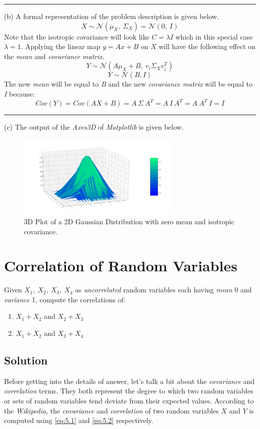 \documentclass[12pt]{article}
\numberwithin{equation}{section}
\numberwithin{table}{section}
\numberwithin{figure}{section}
\begin{document}
\noindent\rule{\textwidth}{.5pt}
(b) A formal representation of the problem description is given below.
$$
	X \sim \mathcal{N}(\mu_X, \ \Sigma_X) = \mathcal{N}(0, \ I)
$$
Note that the isotropic covariance will look like $C=\lambda I$ which in this special case $\lambda = 1$. Applying the linear map $y = Ax + B$ on $X$ will have the following effect on the \textit{mean} and \textit{covariance matrix}.
$$
	Y \sim \mathcal{N}(A\mu_X + B, \ v_i \Sigma_X v_i^T)
$$
$$
	Y \sim \mathcal{N}(B, I)
$$
The new \textit{mean} will be equal to \textit{B} and the new \textit{covariance matrix} will be equal to \textit{I} because:
$$
	Cov(Y) = Cov(AX + B) = A\ \Sigma \ A^T = A\ I\ A^T = A\ A^T\ I = I
$$
\noindent\rule{\textwidth}{.5pt}
(c) The output of the \textit{Axes3D} of \textit{Matplotlib} is given below.
\begin{figure}[!h]\centering
	\includegraphics[width=0.7\textwidth]{multivariate_normal.png}
	\caption{3D Plot of a 2D Gaussian Distribution with zero mean and isotropic covariance.}
	\label{figsolplot}
\end{figure}
\newpage

\section{Correlation of Random Variables}
Given $X_1,\ X_2,\ X_3,\ X_4$ as \textit{uncorrelated} random variables each having \textit{mean} 0 and \textit{variance} 1, compute the correlations of:\\
\begin{enumerate}[label=(\alph*)]
	\item $X_1 + X_2$ and $X_2 + X_3$
	
	\item $X_1 + X_2$ and $X_3 + X_4$
\end{enumerate}

\subsection*{Solution}
Before getting into the details of answer, let's talk a bit about the \textit{covariance} and \textit{correlation} terms. They both represent the degree to which two random variables or sets of random variables tend deviate from their expected values. According to the \textit{Wikipedia}, the \textit{covariance} and \textit{correlation} of two random variables $X$ and $Y$ is computed using \ref{eq:5.1} and \ref{eq:5.2} respectively.
\end{document}
